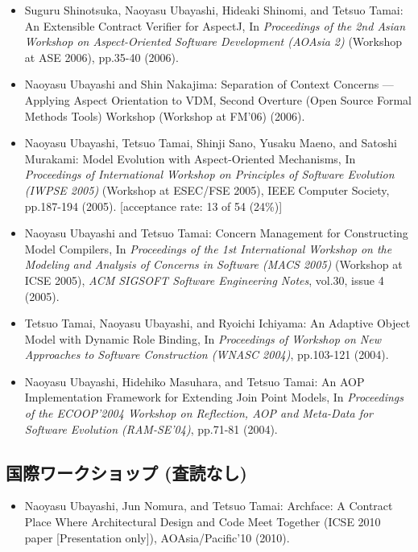 \documentclass{jarticle}
\begin{document}
\begin{itemize}
\item Suguru Shinotsuka, Naoyasu Ubayashi, Hideaki Shinomi, and Tetsuo Tamai:
An Extensible Contract Verifier for AspectJ,
In {\em Proceedings of the 2nd Asian Workshop on Aspect-Oriented Software Development (AOAsia 2)} (Workshop at ASE 2006),
pp.35-40 (2006).

\item Naoyasu Ubayashi and Shin Nakajima:
Separation of Context Concerns --- Applying Aspect Orientation to VDM,
Second Overture (Open Source Formal Methods Tools) Workshop (Workshop at FM'06)
(2006).

\item Naoyasu Ubayashi, Tetsuo Tamai, Shinji Sano, Yusaku Maeno, and Satoshi Murakami:
Model Evolution with Aspect-Oriented Mechanisms,
In {\em Proceedings of International Workshop on Principles of Software Evolution (IWPSE 2005)} (Workshop at ESEC/FSE 2005),
IEEE Computer Society,
pp.187-194 (2005).
[acceptance rate: 13 of 54 (24\%)]

\item Naoyasu Ubayashi and Tetsuo Tamai:
Concern Management for Constructing Model Compilers,
In {\em Proceedings of the 1st International Workshop on the Modeling and Analysis of Concerns in Software (MACS 2005)} (Workshop at ICSE 2005),
{\em ACM SIGSOFT Software Engineering Notes}, vol.30, issue 4 (2005).

\item Tetsuo Tamai, Naoyasu Ubayashi, and Ryoichi Ichiyama:
An Adaptive Object Model with Dynamic Role Binding,
In {\em Proceedings of Workshop on New Approaches to Software Construction (WNASC 2004)},
pp.103-121 (2004).

\item Naoyasu Ubayashi, Hidehiko Masuhara, and Tetsuo Tamai:
An AOP Implementation Framework for Extending Join Point Models,
In {\em Proceedings of the ECOOP'2004 Workshop on Reflection, AOP and Meta-Data for Software Evolution (RAM-SE'04)},
pp.71-81 (2004).
\end{itemize}

\subsection{国際ワークショップ (査読なし)}

\begin{itemize}
\item Naoyasu Ubayashi, Jun Nomura, and Tetsuo Tamai:
Archface: A Contract Place Where Architectural Design and Code Meet Together (ICSE 2010 paper [Presentation only]),
AOAsia/Pacific'10 (2010).
\end{itemize}
\end{document}
